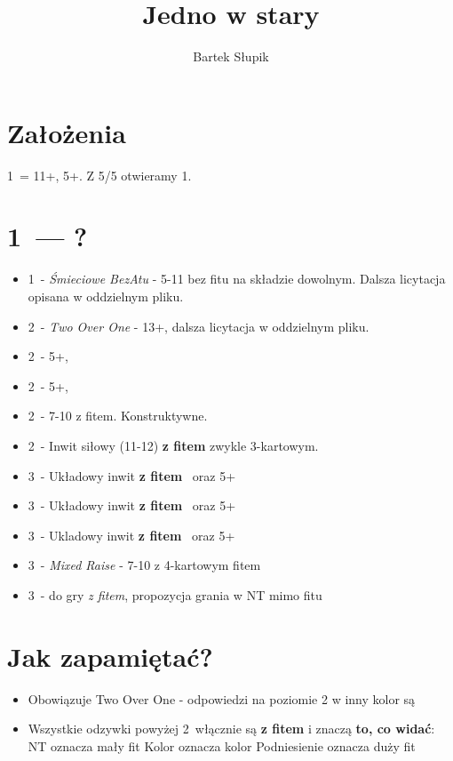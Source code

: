 \documentclass[12pt, a4paper]{article}
\title{Jedno w stary}
\author{Bartek Słupik}
\begin{document}
    \maketitle
    \section{Założenia}
    1\major\ = 11+, 5+\major. Z 5/5 otwieramy 1\spades.

    \section{1\spades\ --- ?}
    \begin{itemize}
        \item 1\nt\ - \emph{Śmieciowe BezAtu} - 5-11 bez fitu na składzie dowolnym. Dalsza licytacja opisana w oddzielnym pliku.
        \br
        \item 2\clubs\ - \emph{Two Over One} - 13+, dalsza licytacja w oddzielnym pliku.
        \item 2\diams\ - 5+\diams, \gf
        \item 2\hearts\ - 5+\hearts, \gf
        \br
        \item 2\spades\ - 7-10 z fitem. Konstruktywne.
        \item 2\nt\ - Inwit siłowy (11-12) \textbf{z fitem} zwykle 3-kartowym.
        \br
        \item 3\clubs\ - Układowy inwit \textbf{z fitem} \spades\ oraz 5+\clubs
        \item 3\diams\ - Układowy inwit \textbf{z fitem} \spades\ oraz 5+\diams
        \item 3\hearts\ - Ukladowy inwit \textbf{z fitem} \spades\ oraz 5+\hearts
        \item 3\spades\ - \emph{Mixed Raise} - 7-10 z 4-kartowym fitem
        \br
        \item 3\nt\ - do gry \emph{z fitem}, propozycja grania w NT mimo fitu
    \end{itemize}
    \section{Jak zapamiętać?}
    \begin{itemize}
        \item Obowiązuje Two Over One - odpowiedzi na poziomie 2 w inny kolor są \gf
        \item Wszystkie odzywki powyżej 2\nt\ włącznie są \textbf{z fitem} i znaczą \textbf{to, co widać}:
        \subitem NT oznacza mały fit
        \subitem Kolor oznacza kolor
        \subitem Podniesienie oznacza duży fit
    \end{itemize}
\end{document}
